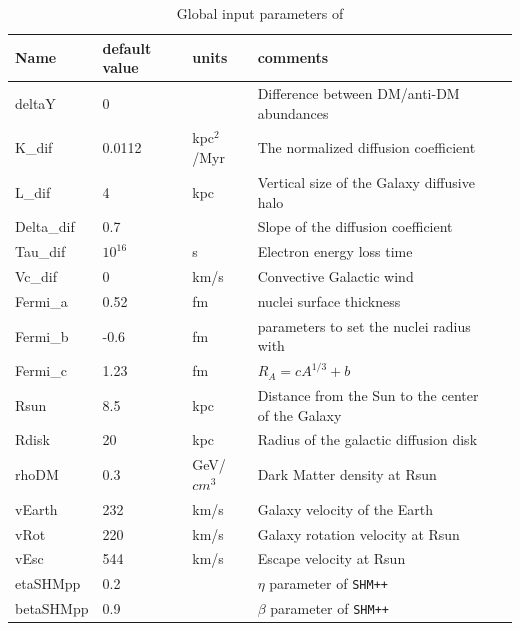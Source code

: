 \documentclass[12pt,a4paper]{article}
\begin{document}
\begin{table}[h!!]\centering
\caption{Global input parameters of \micro} \label{paramTab}
\begin{tabular}{|l|l|l|l|l|}
\hline
Name      &default value & units &  comments \\  \hline
deltaY     &  0          &           & Difference between DM/anti-DM abundances\\
K\_dif      & 0.0112     & kpc$^2$/Myr & The normalized diffusion coefficient\\
L\_dif      & 4           & kpc       & Vertical size of the Galaxy diffusive halo \\
Delta\_dif   & 0.7        &           &Slope of the diffusion coefficient\\ 
Tau\_dif    & $10^{16}$   &   s       &Electron energy loss time\\
Vc\_dif     & 0           &  km/s     &  Convective Galactic wind \\
Fermi\_a    &  0.52        &  fm   & nuclei  surface thickness \\
Fermi\_b    &  -0.6        &  fm   &  parameters to set the nuclei radius with  \\    
Fermi\_c    &  1.23        &  fm   &  $R_A=c A^{1/3} +b$ \\ 
Rsun        & 8.5          & kpc   & Distance from the Sun to the center of the Galaxy\\
Rdisk       & 20           & kpc   & Radius of the galactic diffusion disk \\
rhoDM       &  0.3         & GeV/$cm^3$ & Dark Matter density at Rsun\\
vEarth      &  232       & km/s     & Galaxy velocity of the Earth     \\
vRot       &  220   & km/s     & Galaxy rotation velocity at Rsun     \\
vEsc       &  544   & km/s     & Escape velocity at Rsun     \\
etaSHMpp   &  0.2   &          & $\eta$ parameter of {\tt SHM++}\\
betaSHMpp  &  0.9   &          & $\beta$ parameter of {\tt SHM++}\\
\hline
\end{tabular}\vspace*{3mm}
\end{table}
\end{document}
